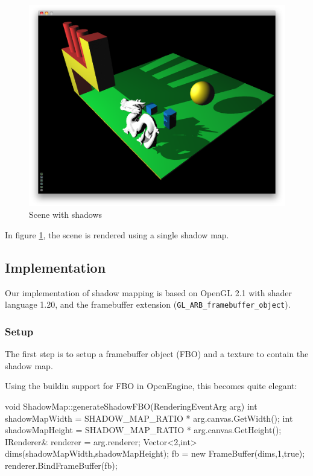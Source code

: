 \begin{figure}[h]
  \centering
  \includegraphics[width=\textwidth]{gfx/scenewithshadow}  
  \caption{Scene with shadows}
  \label{fig:sceneshadow}
\end{figure}

In figure \ref{fig:sceneshadow}, the scene is rendered using a single
shadow map.

\newpage


\subsection{Implementation}

Our implementation of shadow mapping is based on OpenGL 2.1 with
shader language 1.20, and the framebuffer extension
(\texttt{GL\_ARB\_framebuffer\_object}).



\subsubsection*{Setup}

The first step is to setup a framebuffer object (FBO) and a texture to
contain the shadow map.

Using the buildin support for FBO in OpenEngine, this becomes quite elegant:
\begin{cppcode}
void ShadowMap::generateShadowFBO(RenderingEventArg arg) {
	int shadowMapWidth = SHADOW_MAP_RATIO * arg.canvas.GetWidth();
	int shadowMapHeight = SHADOW_MAP_RATIO * arg.canvas.GetHeight();
    IRenderer& renderer = arg.renderer;
    Vector<2,int> dims(shadowMapWidth,shadowMapHeight);
    fb = new FrameBuffer(dims,1,true);
    renderer.BindFrameBuffer(fb);
}
\end{cppcode}



